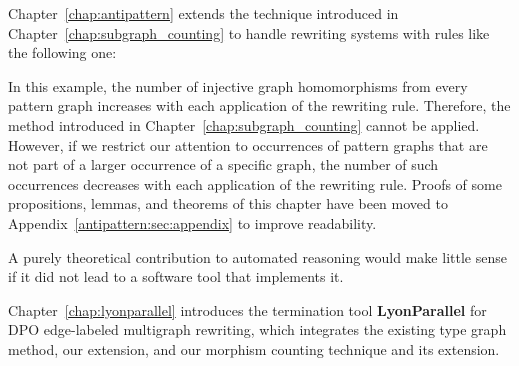 Chapter~\ref{chap:antipattern} extends the technique introduced in Chapter~\ref{chap:subgraph_counting} to handle rewriting systems with rules like the following one:

\begin{center}
\end{center}
In this example, the number of injective graph homomorphisms from every pattern graph increases with each application of the rewriting rule. Therefore, the method introduced in Chapter~\ref{chap:subgraph_counting} cannot be applied. However, if we restrict our attention to occurrences of pattern graphs that are not part of a larger occurrence of a specific graph, the number of such occurrences decreases with each application of the rewriting rule. 
Proofs of some propositions, lemmas, and theorems of this chapter have been moved to Appendix~\ref{antipattern:sec:appendix} to improve readability.

A purely theoretical contribution to automated reasoning would make little sense if it did not lead to a software tool that implements it.

Chapter~\ref{chap:lyonparallel} introduces the termination tool \textbf{LyonParallel} for DPO edge-labeled multigraph rewriting, which integrates the existing type graph method, our extension, and our morphism counting technique and its extension.  